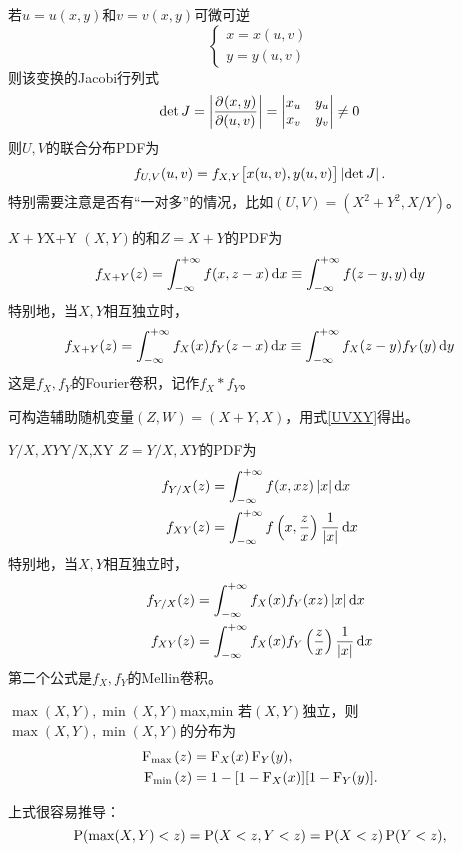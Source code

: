 若$u=u(x,y)$和$v=v(x,y)$可微可逆
\[
	\begin{cases}
		x=x(u,v)\\
		y=y(u,v)
	\end{cases}
\]
则该变换的Jacobi行列式
\[
	\det J=\abs{\pv{(x,y)}{(u,v)}}=\begin{vmatrix}
		x_u&y_u\\x_v&y_v
	\end{vmatrix}\neq 0
\]
则$U,V$的联合分布PDF为
\begin{align}\label{UVXY}
	f_{U,V}(u,v)=f_{X,Y}\bigfkh{x(u,v),y(u,v)}\abs{\det J}.
\end{align}
特别需要注意是否有“一对多”的情况，比如$(U,V)=(X^2+Y^2,X/Y)$。
\begin{example}{$X+Y$}{X+Y}
	$(X,Y)$的和$Z=X+Y$的PDF为
	\begin{align}
		f_{X+Y}(z)=\int\iti f(x,z-x)\d x\equiv\int\iti f(z-y,y)\d y
	\end{align}
	特别地，当$X,Y$相互独立时，%
	\[
		f_{X+Y}(z)=\int\iti f_X(x)f_Y(z-x)\d x\equiv\int\iti f_X(z-y)f_Y(y)\d y
	\]
	这是$f_X,f_Y$的Fourier卷积，记作$f_X\ast f_Y$。
\end{example}
可构造辅助随机变量$(Z,W)=(X+Y,X)$，用式\eqref{UVXY}得出。
\begin{example}{$Y/X,XY$}{Y/X,XY}
	$Z=Y/X,XY$的PDF为
	\begin{align}
		f_{Y/X}(z)&=\int\iti f(x,xz)\abs x\d x\\
		f_{XY}(z)&=\int\iti f\kh{x,\frac zx}\frac1{\abs{x}}\d x
	\end{align}
	特别地，当$X,Y$相互独立时，
	\begin{align*}
		f_{Y/X}(z)&=\int\iti f_X(x)f_Y(xz)\abs x\d x\\
		f_{XY}(z)&=\int\iti f_X(x)f_Y\kh{\frac zx}\frac1{\abs x}\d x
	\end{align*}
	第二个公式是$f_X,f_Y$的Mellin卷积。
\end{example}
\begin{example}{$\max(X,Y),\min(X,Y)$}{max,min}
	若$(X,Y)$独立，则$\max(X,Y),\min(X,Y)$的分布为
	\begin{align}
		\CDF_{\max{}}(z)&=\CDF_X(x)\CDF_Y(y),\\
		\CDF_{\min{}}(z)&=1-[1-\CDF_X(x)][1-\CDF_Y(y)].
	\end{align}
\end{example}
上式很容易推导：
\[
	\P(\max(X,Y)<z)=\P(X<z,Y<z)=\P(X<z)\P(Y<z),
\]
